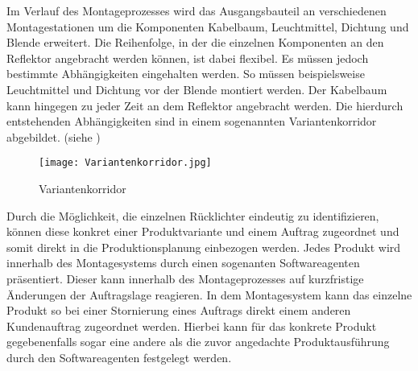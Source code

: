 Im Verlauf des Montageprozesses wird das Ausgangsbauteil an verschiedenen
Montagestationen um die Komponenten Kabelbaum, Leuchtmittel, Dichtung und
Blende erweitert. Die Reihenfolge, in der die einzelnen Komponenten an den
Reflektor angebracht werden können, ist dabei flexibel. Es müssen jedoch
bestimmte Abhängigkeiten eingehalten werden. So müssen beispielsweise 
Leuchtmittel und Dichtung vor der Blende montiert werden. Der Kabelbaum kann
hingegen zu jeder Zeit an dem Reflektor angebracht werden. Die hierdurch
entstehenden Abhängigkeiten sind in einem sogenannten Variantenkorridor
abgebildet. (siehe )

\begin{figure}[htb] 
\centering
\texttt{[image: Variantenkorridor.jpg]}
\caption[Montagestation]{Variantenkorridor\protect\footnotemark}
\label{fig:Variantenkorridor}
\end{figure}

Durch die Möglichkeit, die einzelnen Rücklichter eindeutig zu identifizieren,
können diese konkret einer Produktvariante und einem Auftrag zugeordnet und
somit direkt in die Produktionsplanung einbezogen werden. Jedes Produkt wird
innerhalb des Montagesystems durch einen sogenanten Softwareagenten
präsentiert. Dieser kann innerhalb des Montageprozesses auf kurzfristige
Änderungen der Auftragslage reagieren. In dem Montagesystem kann das einzelne 
Produkt so bei einer Stornierung eines Auftrags direkt einem anderen
Kundenauftrag zugeordnet werden. Hierbei kann für das konkrete Produkt
gegebenenfalls sogar eine andere als die zuvor angedachte Produktausführung
durch den Softwareagenten festgelegt werden.


